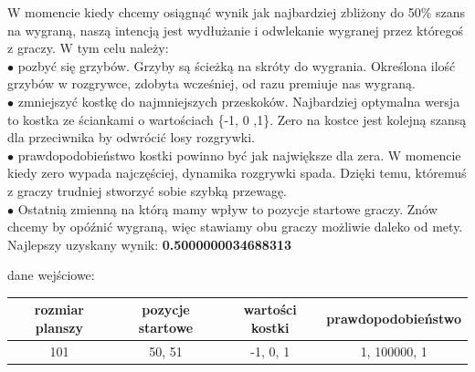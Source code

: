 \documentclass[8pt]{article}
\begin{document}
W momencie kiedy chcemy osiągnąć wynik jak najbardziej zbliżony do 50\% szans na wygraną, naszą intencją jest wydłużanie i  odwlekanie wygranej przez któregoś z graczy. W tym celu należy:\\
$\bullet$  \quad pozbyć się grzybów. Grzyby są ścieżką na skróty do wygrania. Określona ilość grzybów w rozgrywce, zdobyta wcześniej, od razu premiuje nas wygraną.\\
$\bullet$  \quad zmniejszyć kostkę do najmniejszych przeskoków. Najbardziej optymalna wersja to kostka ze ściankami o wartościach \{-1, 0 ,1\}. Zero na kostce jest kolejną szansą dla przeciwnika by odwrócić losy rozgrywki.\\
$\bullet$  \quad prawdopodobieństwo kostki powinno być jak największe dla zera.  W momencie kiedy zero wypada najczęściej, dynamika rozgrywki spada. Dzięki temu, któremuś z graczy trudniej stworzyć sobie szybką przewagę. \\
$\bullet$  \quad Ostatnią zmienną na którą mamy wpływ to pozycje startowe graczy. Znów chcemy by opóźnić wygraną, więc stawiamy obu graczy możliwie daleko od mety.\\
Najlepszy uzyskany wynik:  \textbf{0.5000000034688313}\\
\begin{center}
dane wejściowe: \\

\begin{tabular}{  | c | c | c | c | }
  \hline
  rozmiar planszy &pozycje startowe& wartości kostki & prawdopodobieństwo \\\hline
   101 & 50, 51  & -1, 0, 1& 1, 100000, 1\\\hline
  \hline
\end{tabular} 
\end{center}
\end{document}
